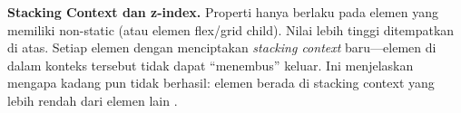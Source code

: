 \begin{konsep}
\textbf{Stacking Context dan z-index.} Properti  hanya berlaku pada elemen yang memiliki  non-static (atau elemen flex/grid child). Nilai lebih tinggi ditempatkan di atas. Setiap elemen dengan  menciptakan \textit{stacking context} baru---elemen di dalam konteks tersebut tidak dapat ``menembus'' keluar. Ini menjelaskan mengapa kadang  pun tidak berhasil: elemen berada di stacking context yang lebih rendah dari elemen lain \cite{mdnCss}.
\end{konsep}

